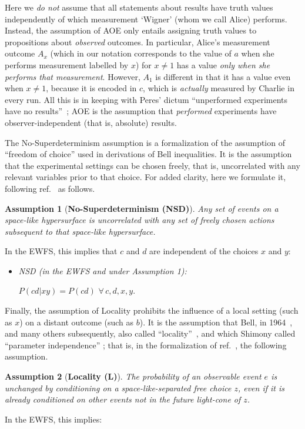 \documentclass[aps,prx,twocolumn,superscriptaddress]{revtex4-1}
\theoremstyle{plain}
\newtheorem{ass}{Assumption}
\begin{document}
Here we \emph{do not} assume that all statements about results have truth values independently of which measurement `Wigner' (whom we call Alice) performs. Instead, 
the assumption of {AOE} only entails assigning truth values to propositions about \emph{observed} outcomes. 
In particular, Alice's measurement outcome $A_x$ (which in our notation corresponds to the value of $a$ when she performs measurement labelled by $x$) for $x\neq 1$ has a value \emph{only when she performs that measurement}.
However, $A_1$ is different in that it has a value even when $x\ne1$, because it is encoded in $c$, which is \emph{actually} measured by Charlie in every run. All this is in keeping with Peres' dictum ``unperformed experiments have no results''~\cite{Peres1978}; AOE is the assumption that \emph{performed} experiments have observer-independent (that is, absolute) results. 

The {No-Superdeterminism} assumption is a formalization of the assumption of ``freedom of choice'' used in derivations of Bell inequalities. It is the assumption that the experimental settings can be chosen freely, that is, uncorrelated with any relevant variables prior to that choice. For added clarity, here we formulate it, following ref.~\cite{Causarum} as follows.

\begin{ass}[\textbf{{No-Superdeterminism} (NSD)}] Any set of events on a space-like hypersurface is uncorrelated with any set of freely chosen actions subsequent to that space-like hypersurface.
\end{ass}

In the EWFS, this implies that $c$ and $d$ are independent of the choices $x$ and $y$:
\begin{itemize}
\item \textit{{NSD} (in the EWFS and under Assumption 1):} 

$P(cd|xy)=P(cd)$ $\forall \, c,d,x,y$.
\end{itemize}


Finally, the assumption of {Locality} prohibits the influence of a local setting (such as $x$) on a distant outcome (such as $b$). It is the assumption that Bell, in 1964~\cite{Bell1964}, and many others subsequently, also called ``{locality}''~\cite{Causarum}, and which Shimony called ``parameter independence'' \cite{Shimony1984}; that is, in the formalization of ref.~\cite{Causarum}, the following assumption. 
\begin{ass}[\textbf{{Locality} (L)}] The probability of an observable event $e$ is unchanged by conditioning on a space-like-separated free choice $z$, even if it is already conditioned on other events not in the future light-cone of $z$.
\end{ass}
In the EWFS, this
implies:
\end{document}

